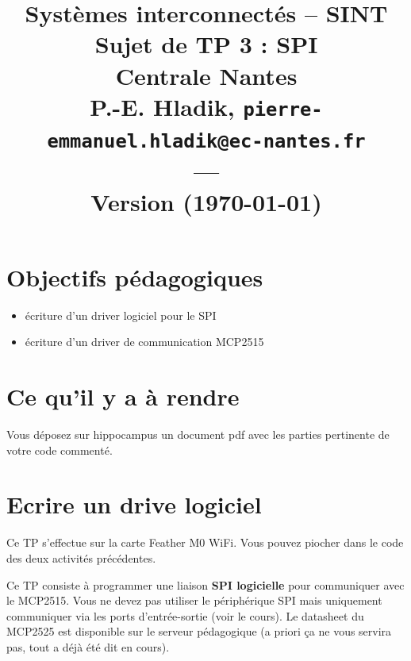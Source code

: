 \documentclass[11pt]{paper}
\title{{\Large Systèmes interconnectés -- SINT }\\
\vspace{-0.4em}
{\large Sujet de TP 3 : SPI}\\
{\small Centrale Nantes}\\
\small P.-E. Hladik, \small{\texttt{pierre-emmanuel.hladik@ec-nantes.fr}}\\
---\\
{\scriptsize  Version \version (\today)}\\
}
\begin{document}
\maketitle


  \section{Objectifs pédagogiques}


\begin{itemize}
	\item écriture d'un driver logiciel pour le SPI
	\item écriture d'un driver de communication MCP2515
\end{itemize}


  \section{Ce qu'il y a à rendre}

Vous déposez sur hippocampus un document pdf avec les parties pertinente de votre code commenté.

  \section{Ecrire un drive logiciel}

Ce TP s’effectue sur la carte Feather M0 WiFi. Vous pouvez piocher dans le code des deux activités précédentes.

Ce TP  consiste à programmer une liaison {\bf SPI logicielle} pour communiquer avec le MCP2515. Vous ne devez pas utiliser le périphérique SPI mais uniquement communiquer via les ports d'entrée-sortie (voir le cours). Le datasheet du MCP2525 est disponible sur le serveur pédagogique (a priori ça ne vous servira pas, tout a déjà été dit en cours). 
\end{document}
